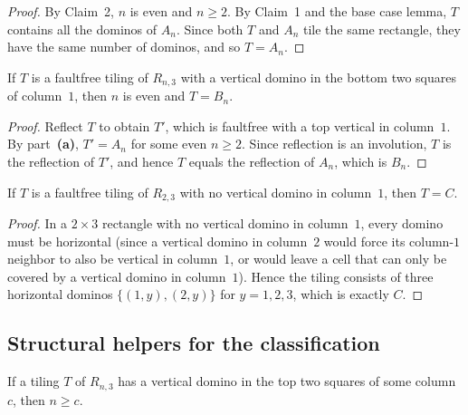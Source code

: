 \begin{proof}
\leanok
By Claim~2, $n$ is even and $n \ge 2$.
By Claim~1 and the base case lemma, $T$ contains all the dominos of $A_n$.
Since both $T$ and $A_n$ tile the same rectangle, they have the same number
of dominos, and so $T = A_n$.
\end{proof}

\begin{lemma}
\label{lem.details.domino.classification-part-b}
\leanhelper
\leanok
If $T$ is a faultfree tiling of $R_{n,3}$ with a vertical domino in the bottom
two squares of column~$1$, then $n$ is even and $T = B_n$.
\end{lemma}

\begin{proof}
\leanok
Reflect $T$ to obtain $T'$, which is faultfree with a top vertical in column~$1$.
By part~\textbf{(a)}, $T' = A_n$ for some even $n \ge 2$.
Since reflection is an involution, $T$ is the reflection of $T'$, and hence
$T$ equals the reflection of $A_n$, which is $B_n$.
\end{proof}

\begin{lemma}
\label{lem.details.domino.classification-part-c}
\leanhelper
\leanok
If $T$ is a faultfree tiling of $R_{2,3}$ with no vertical domino in column~$1$,
then $T = C$.
\end{lemma}

\begin{proof}
\leanok
In a $2 \times 3$ rectangle with no vertical domino in column~$1$,
every domino must be horizontal (since a vertical domino in column~$2$
would force its column-$1$ neighbor to also be vertical in column~$1$, or
would leave a cell that can only be covered by a vertical domino in
column~$1$). Hence the tiling consists of three horizontal dominos
$\{(1,y),(2,y)\}$ for $y = 1, 2, 3$, which is exactly $C$.
\end{proof}

\subsection{Structural helpers for the classification}

\begin{lemma}
\label{lem.details.domino.hasTopVertical-implies-n-ge}
\leanhelper
\leanok
If a tiling $T$ of $R_{n,3}$ has a vertical domino in the top two squares
of some column $c$, then $n \ge c$.
\end{lemma}

